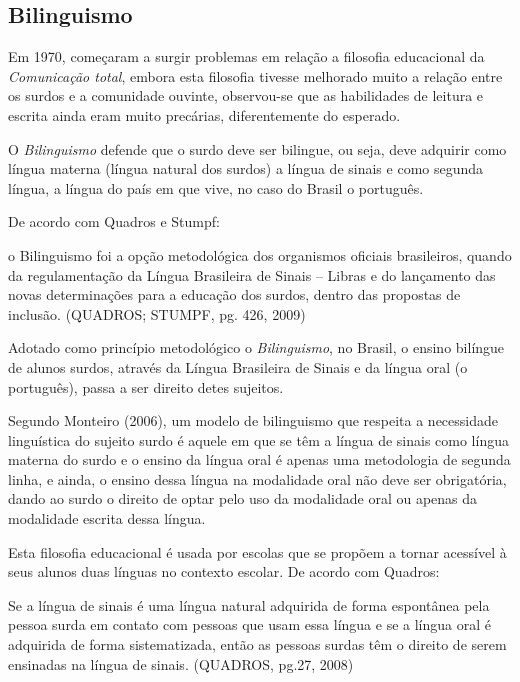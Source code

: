 \documentclass[brasil]{abnt}
\begin{document}
		\subsection{Bilinguismo}
			Em 1970, começaram a surgir problemas em relação a filosofia educacional da \textit{Comunicação total}, embora esta filosofia tivesse melhorado muito a relação entre os surdos e a comunidade ouvinte, observou-se que as 
			habilidades de leitura e escrita ainda eram muito precárias, diferentemente do esperado. 
			
			O \textit{Bilinguismo} defende que o surdo deve ser bilingue, ou seja, deve adquirir como língua materna (língua natural dos surdos) a língua de sinais e como segunda língua, a língua do país em que vive, 
			no caso do Brasil o português.
			
			De acordo com Quadros e Stumpf:
			
				\begin{citacao}o Bilinguismo foi a opção metodológica dos organismos oficiais brasileiros, quando da regulamentação da Língua Brasileira de Sinais – Libras e do lançamento das novas determinações para
								a educação dos surdos, dentro das propostas de inclusão. (QUADROS; STUMPF, pg. 426, 2009)
				\end{citacao}
			
			Adotado como princípio metodológico o \textit{Bilinguismo}, no Brasil, o ensino bilíngue de alunos surdos, através da Língua Brasileira de Sinais e da língua oral (o português), passa a ser direito detes sujeitos. 
			
			Segundo Monteiro (2006), um modelo de bilinguismo que respeita a necessidade linguística do sujeito surdo é aquele em que se têm a língua de sinais como língua materna do surdo e o ensino da língua 
			oral é apenas uma metodologia de segunda linha, e ainda, o ensino dessa língua na modalidade oral não deve ser obrigatória, dando ao surdo o direito de optar pelo uso da modalidade oral ou apenas 
			da modalidade escrita dessa língua.
						
			Esta filosofia educacional é usada por escolas que se propõem a tornar acessível à seus alunos duas línguas no contexto escolar. De acordo com Quadros:
			
				\begin{citacao} Se a língua de sinais é uma língua natural adquirida de forma espontânea pela pessoa surda em contato com pessoas que usam essa língua e se a língua oral é adquirida de forma sistematizada,
								então as pessoas surdas têm o direito de serem ensinadas na língua de sinais. (QUADROS, pg.27, 2008) 		
				\end{citacao}
			
\end{document}
